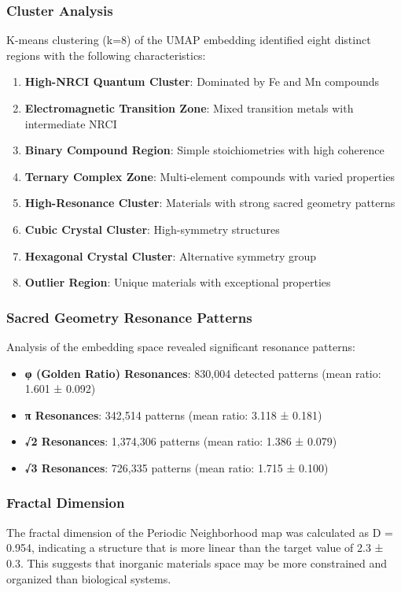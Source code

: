 \documentclass[12pt,a4paper]{article}
\begin{document}
\subsubsection{Cluster Analysis}
K-means clustering (k=8) of the UMAP embedding identified eight distinct regions with the following characteristics:
\begin{enumerate}
    \item \textbf{High-NRCI Quantum Cluster}: Dominated by Fe and Mn compounds
    \item \textbf{Electromagnetic Transition Zone}: Mixed transition metals with intermediate NRCI
    \item \textbf{Binary Compound Region}: Simple stoichiometries with high coherence
    \item \textbf{Ternary Complex Zone}: Multi-element compounds with varied properties
    \item \textbf{High-Resonance Cluster}: Materials with strong sacred geometry patterns
    \item \textbf{Cubic Crystal Cluster}: High-symmetry structures
    \item \textbf{Hexagonal Crystal Cluster}: Alternative symmetry group
    \item \textbf{Outlier Region}: Unique materials with exceptional properties
\end{enumerate}

\subsubsection{Sacred Geometry Resonance Patterns}
Analysis of the embedding space revealed significant resonance patterns:
\begin{itemize}
    \item \textbf{φ (Golden Ratio) Resonances}: 830,004 detected patterns (mean ratio: 1.601 ± 0.092)
    \item \textbf{π Resonances}: 342,514 patterns (mean ratio: 3.118 ± 0.181)
    \item \textbf{√2 Resonances}: 1,374,306 patterns (mean ratio: 1.386 ± 0.079)
    \item \textbf{√3 Resonances}: 726,335 patterns (mean ratio: 1.715 ± 0.100)
\end{itemize}

\subsubsection{Fractal Dimension}
The fractal dimension of the Periodic Neighborhood map was calculated as D = 0.954, indicating a structure that is more linear than the target value of 2.3 ± 0.3. This suggests that inorganic materials space may be more constrained and organized than biological systems.
\end{document}
